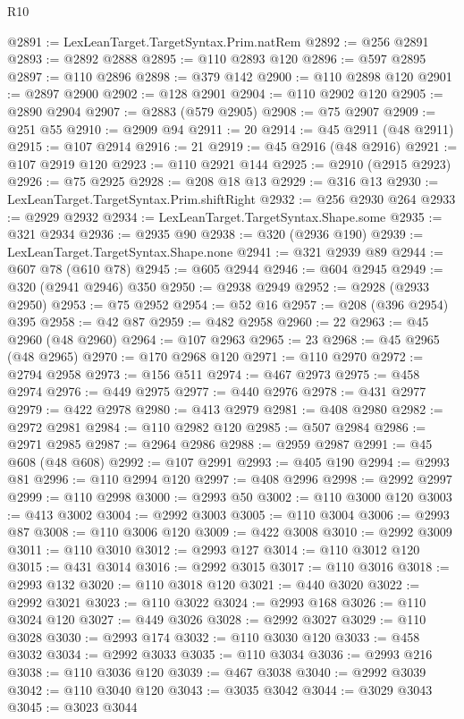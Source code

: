\begin{lexlean}{R10}
\begin{coremodule}
{{{{{{{{{{{{{{{{{{{{{{{{{{{{{{{{{{{{{{{{{{{{{{{{{{{{{{{{{{{{{{{{{{{{{{{{{{{{{{{{{{{{@2891 := LexLeanTarget.TargetSyntax.Prim.natRem
@2892 := @256 @2891
@2893 := @2892 @2888
@2895 := @110 @2893 @120
@2896 := @597 @2895
@2897 := @110 @2896
@2898 := @379 @142
@2900 := @110 @2898 @120
@2901 := @2897 @2900
@2902 := @128 @2901
@2904 := @110 @2902 @120
@2905 := @2890 @2904
@2907 := @2883 (@579 @2905)
@2908 := @75 @2907
@2909 := @251 @55
@2910 := @2909 @94
@2911 := 20
@2914 := @45 @2911 (@48 @2911)
@2915 := @107 @2914
@2916 := 21
@2919 := @45 @2916 (@48 @2916)
@2921 := @107 @2919 @120
@2923 := @110 @2921 @144
@2925 := @2910 (@2915 @2923)
@2926 := @75 @2925
@2928 := @208 @18 @13
@2929 := @316 @13
@2930 := LexLeanTarget.TargetSyntax.Prim.shiftRight
@2932 := @256 @2930 @264
@2933 := @2929 @2932
@2934 := LexLeanTarget.TargetSyntax.Shape.some
@2935 := @321 @2934
@2936 := @2935 @90
@2938 := @320 (@2936 @190)
@2939 := LexLeanTarget.TargetSyntax.Shape.none
@2941 := @321 @2939 @89
@2944 := @607 @78 (@610 @78)
@2945 := @605 @2944
@2946 := @604 @2945
@2949 := @320 (@2941 @2946) @350
@2950 := @2938 @2949
@2952 := @2928 (@2933 @2950)
@2953 := @75 @2952
@2954 := @52 @16
@2957 := @208 (@396 @2954) @395
@2958 := @42 @87
@2959 := @482 @2958
@2960 := 22
@2963 := @45 @2960 (@48 @2960)
@2964 := @107 @2963
@2965 := 23
@2968 := @45 @2965 (@48 @2965)
@2970 := @170 @2968 @120
@2971 := @110 @2970
@2972 := @2794 @2958
@2973 := @156 @511
@2974 := @467 @2973
@2975 := @458 @2974
@2976 := @449 @2975
@2977 := @440 @2976
@2978 := @431 @2977
@2979 := @422 @2978
@2980 := @413 @2979
@2981 := @408 @2980
@2982 := @2972 @2981
@2984 := @110 @2982 @120
@2985 := @507 @2984
@2986 := @2971 @2985
@2987 := @2964 @2986
@2988 := @2959 @2987
@2991 := @45 @608 (@48 @608)
@2992 := @107 @2991
@2993 := @405 @190
@2994 := @2993 @81
@2996 := @110 @2994 @120
@2997 := @408 @2996
@2998 := @2992 @2997
@2999 := @110 @2998
@3000 := @2993 @50
@3002 := @110 @3000 @120
@3003 := @413 @3002
@3004 := @2992 @3003
@3005 := @110 @3004
@3006 := @2993 @87
@3008 := @110 @3006 @120
@3009 := @422 @3008
@3010 := @2992 @3009
@3011 := @110 @3010
@3012 := @2993 @127
@3014 := @110 @3012 @120
@3015 := @431 @3014
@3016 := @2992 @3015
@3017 := @110 @3016
@3018 := @2993 @132
@3020 := @110 @3018 @120
@3021 := @440 @3020
@3022 := @2992 @3021
@3023 := @110 @3022
@3024 := @2993 @168
@3026 := @110 @3024 @120
@3027 := @449 @3026
@3028 := @2992 @3027
@3029 := @110 @3028
@3030 := @2993 @174
@3032 := @110 @3030 @120
@3033 := @458 @3032
@3034 := @2992 @3033
@3035 := @110 @3034
@3036 := @2993 @216
@3038 := @110 @3036 @120
@3039 := @467 @3038
@3040 := @2992 @3039
@3042 := @110 @3040 @120
@3043 := @3035 @3042
@3044 := @3029 @3043
@3045 := @3023 @3044
}}}}}}}}}}}}}}}}}}}}}}}}}}}}}}}}}}}}}}}}}}}}}}}}}}}}}}}}}}}}}}}}}}}}}}}}}}}}}}}}}}}}
\end{coremodule}
\end{lexlean}

